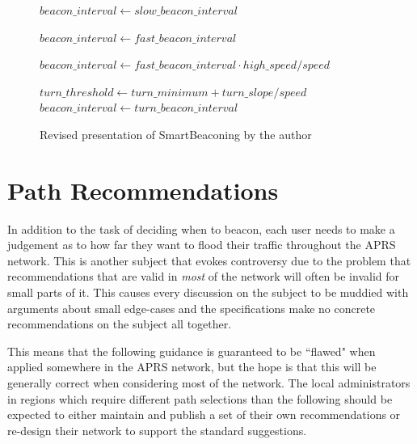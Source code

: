 \begin{figure}[p]
\begin{algorithmic}
	\State $beacon\_interval\gets slow\_beacon\_interval$

\Else
		\State $beacon\_interval\gets fast\_beacon\_interval$    

	\Else
		\State $beacon\_interval\gets fast\_beacon\_interval \cdot high\_speed / speed$

	\EndIf


	\State $turn\_threshold\gets turn\_minimum + turn\_slope / speed$
		\State $beacon\_interval\gets turn\_beacon\_interval$

	\EndIf
\EndIf

	\State {}

\EndIf
\end{algorithmic}
\caption{Revised presentation of SmartBeaconing by the author}
\label{fig:kwfsmartbeacon}
\end{figure}


\section{Path Recommendations}

In addition to the task of deciding when to beacon,
each user needs to make a judgement as to how far they want to flood their
traffic throughout the APRS network.
This is another subject that evokes controversy due to the problem that
recommendations that
are valid in \emph{most} of the network will often be invalid for small parts
of it.
This causes every discussion on the subject to be muddied with arguments
about small edge-cases and the specifications make no concrete recommendations
on the subject all together.

This means that the following guidance is guaranteed to be ``flawed" when
applied somewhere in the APRS network, but the hope is that this will
be generally correct when considering most of the network.
The local administrators in regions which require different path selections 
than the following should be expected to either 
maintain and publish a set of their own
recommendations or re-design their network to support the standard suggestions.

